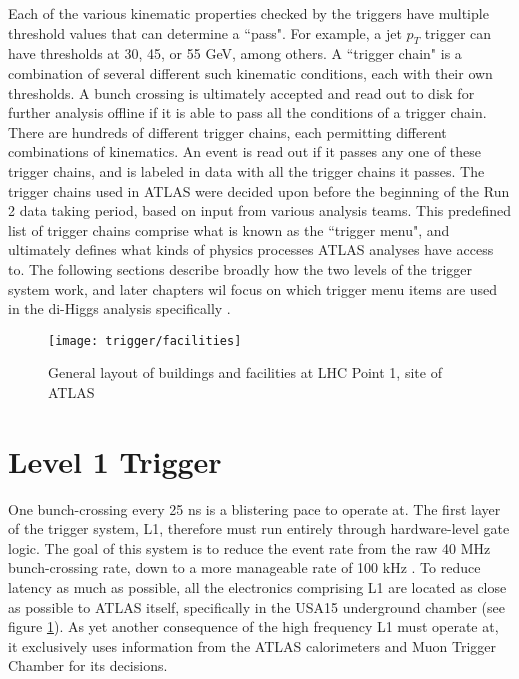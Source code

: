     Each of the various kinematic properties checked by the triggers have multiple threshold values that can determine a ``pass".
    For example, a jet $p_T$ trigger can have thresholds at 30, 45, or 55 GeV, among others.
    A ``trigger chain" is a combination of several different such kinematic conditions, each with their own thresholds.
    A bunch crossing is ultimately accepted and read out to disk for further analysis offline if it is able to pass all the conditions of a trigger chain.
    There are hundreds of different trigger chains, each permitting different combinations of kinematics.
    An event is read out if it passes any one of these trigger chains, and is labeled in data with all the trigger chains it passes.
    The trigger chains used in ATLAS were decided upon before the beginning of the Run 2 data taking period, based on input from various analysis teams.
    This predefined list of trigger chains comprise what is known as the ``trigger menu", and ultimately defines what kinds of physics processes ATLAS analyses have access to.
    The following sections describe broadly how the two levels of the trigger system work, and later chapters wil focus on which trigger menu items are used in the di-Higgs analysis specifically .

    \begin{figure}[h]
        \texttt{[image: trigger/facilities]}
        \caption{General layout of buildings and facilities at LHC Point 1, site of ATLAS \cite{trigger_tdr}}
        \label{fig:facilities}
    \end{figure}


\section{Level 1 Trigger}
    One bunch-crossing every 25 ns is a blistering pace to operate at.
    The first layer of the trigger system, L1, therefore must run entirely through hardware-level gate logic.
    The goal of this system is to reduce the event rate from the raw 40 MHz bunch-crossing rate, down to a more manageable rate of 100 kHz \cite{trigger_run2}.
    To reduce latency as much as possible, all the electronics comprising L1 are located as close as possible to ATLAS itself, specifically in the USA15 underground chamber \cite{trigger_tdr} (see figure \ref{fig:facilities}).
    As yet another consequence of the high frequency L1 must operate at, it exclusively uses information from the ATLAS calorimeters and Muon Trigger Chamber for its decisions.

